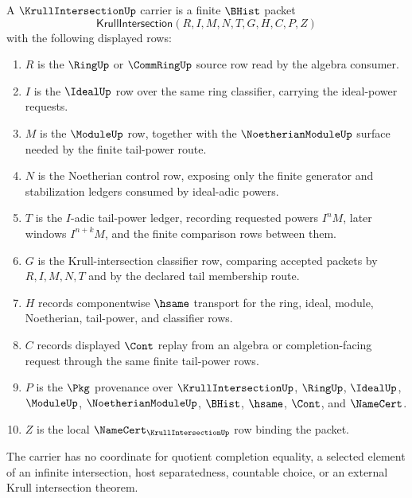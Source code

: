 \begin{definition}
\label{def:krull-intersection-carrier}
A $\KrullIntersectionUp$ carrier is a finite $\BHist$ packet
$$
\mathsf{KrullIntersection}(R,I,M,N,T,G,H,C,P,Z)
$$
with the following displayed rows:
\begin{enumerate}
\item $R$ is the $\RingUp$ or $\CommRingUp$ source row read by the algebra consumer.
\item $I$ is the $\IdealUp$ row over the same ring classifier, carrying the ideal-power requests.
\item $M$ is the $\ModuleUp$ row, together with the $\NoetherianModuleUp$ surface needed by the finite tail-power route.
\item $N$ is the Noetherian control row, exposing only the finite generator and stabilization ledgers consumed by ideal-adic powers.
\item $T$ is the $I$-adic tail-power ledger, recording requested powers $I^nM$, later windows $I^{n+k}M$, and the finite comparison rows between them.
\item $G$ is the Krull-intersection classifier row, comparing accepted packets by $R,I,M,N,T$ and by the declared tail membership route.
\item $H$ records componentwise $\hsame$ transport for the ring, ideal, module, Noetherian, tail-power, and classifier rows.
\item $C$ records displayed $\Cont$ replay from an algebra or completion-facing request through the same finite tail-power rows.
\item $P$ is the $\Pkg$ provenance over $\KrullIntersectionUp$, $\RingUp$, $\IdealUp$, $\ModuleUp$, $\NoetherianModuleUp$, $\BHist$, $\hsame$, $\Cont$, and $\NameCert$.
\item $Z$ is the local $\NameCert_{\KrullIntersectionUp}$ row binding the packet.
\end{enumerate}
The carrier has no coordinate for quotient completion equality, a selected element of an infinite intersection, host separatedness, countable choice, or an external Krull intersection theorem.
\end{definition}

